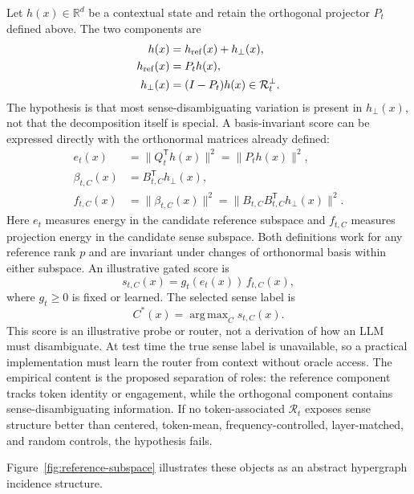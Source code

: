 \documentclass[
  aps,
  reprint,
  superscriptaddress,
  floatfix,
  nofootinbib,
  longbibliography
]{revtex4-2}
\newcommand{\R}{\mathbb{R}}
\newcommand{\T}{^{\mathsf{T}}}
\newcommand{\norm}[1]{\lVert #1 \rVert}
\DeclareMathOperator*{\argmax}{arg\,max}
\begin{document}
Let $h(x)\in\R^d$ be a contextual state and retain the orthogonal projector
$P_t$ defined above. The two components are
%
\begin{align}
\label{eq:reference-decomp}
h(x)&=h_{\rm ref}(x)+h_\perp(x),\\
h_{\rm ref}(x)&=P_t h(x),\nonumber\\
h_\perp(x)&=(I-P_t)h(x)\in\mathcal R_t^\perp.\nonumber
\end{align}
%
The hypothesis is that most sense-disambiguating variation is present in
$h_\perp(x)$, not that the decomposition itself is special.  A
basis-invariant score can be expressed directly with the orthonormal matrices
already defined:
%
\begin{align}
\label{eq:sense-coordinates}
e_t(x)&=\norm{Q_t\T h(x)}^2=\norm{P_t h(x)}^2,\nonumber\\
\beta_{t,C}(x)&=B_{t,C}\T h_\perp(x),\\
f_{t,C}(x)&=\norm{\beta_{t,C}(x)}^2
=\norm{B_{t,C}B_{t,C}\T h_\perp(x)}^2.\nonumber
\end{align}
%
Here $e_t$ measures energy in the candidate reference subspace and $f_{t,C}$
measures projection energy in the candidate sense subspace.  Both definitions
work for any reference rank $p$ and are invariant under changes of orthonormal
basis within either subspace.  An illustrative gated score is
%
\begin{equation}
\label{eq:sense-score}
s_{t,C}(x)=g_t(e_t(x))\,f_{t,C}(x),
\end{equation}
%
where $g_t\ge0$ is fixed or learned.  The selected sense label is
%
\begin{equation}
\label{eq:selected-sense}
C^*(x)=\argmax_C s_{t,C}(x).
\end{equation}
%
This score is an illustrative probe or router, not a derivation of how an LLM
must disambiguate.  At test time the true sense label is unavailable, so a
practical implementation must learn the router from context without oracle
access.  The empirical content is the proposed separation of roles: the
reference component tracks token identity or engagement, while the orthogonal
component contains sense-disambiguating information. If no token-associated
$\mathcal R_t$ exposes sense structure better than centered, token-mean,
frequency-controlled, layer-matched, and random controls, the hypothesis
fails.

Figure~\ref{fig:reference-subspace} illustrates these objects as an abstract
hypergraph incidence structure.
\end{document}
